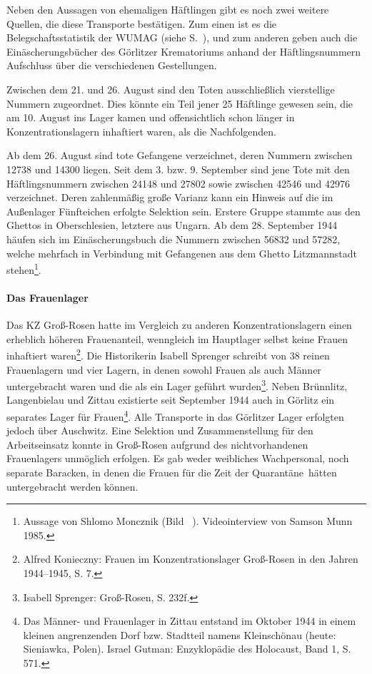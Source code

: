 Neben den Aussagen von ehemaligen Häftlingen gibt es noch zwei weitere Quellen, die diese Transporte bestätigen. Zum einen ist es die Belegschaftsstatistik der WUMAG (siehe S.~\pageref{wumag_pers}), und zum anderen geben auch die Einäscherungsbücher des Görlitzer Krematoriums anhand der Häftlingsnummern Aufschluss über die verschiedenen Gestellungen.\newline


Zwischen dem 21. und 26. August sind den Toten ausschließlich vierstellige Nummern zugeordnet. Dies könnte ein Teil jener 25 Häftlinge gewesen sein, die am 10. August ins Lager kamen und offensichtlich schon länger in Konzentrationslagern inhaftiert waren, als die Nachfolgenden.\newline

Ab dem 26. August sind tote Gefangene verzeichnet, deren Nummern zwischen 12738 und 14300 liegen. Seit dem 3. bzw. 9. September sind jene Tote mit den Häftlingsnummern zwischen 24148 und 27802 sowie zwischen 42546 und 42976 verzeichnet. Deren zahlenmäßig große Varianz kann ein Hinweis auf die im Außenlager Fünfteichen erfolgte Selektion sein. Erstere Gruppe stammte aus den Ghettos in Oberschlesien, letztere aus Ungarn.
Ab dem 28. September 1944 häufen sich im Einäscherungsbuch die Nummern zwischen 56832 und 57282, welche mehrfach in Verbindung mit Gefangenen aus dem Ghetto Litzmannstadt stehen\footnote{Aussage von Shlomo Moncznik (Bild ~). Videointerview von Samson Munn 1985.}.


\paragraph{Das Frauenlager}
Das KZ Groß-Rosen hatte im Vergleich zu anderen Konzentrationslagern einen erheblich höheren Frauenanteil, wenngleich im Hauptlager selbst keine Frauen inhaftiert waren\footnote{Alfred Konieczny: Frauen im Konzentrationslager Groß-Rosen in den Jahren 1944--1945, S. 7.}. Die Historikerin Isabell Sprenger schreibt von 38 reinen Frauenlagern und vier Lagern, in denen sowohl Frauen als auch Männer untergebracht waren und die als ein Lager geführt wurden\footnote{Isabell Sprenger: Groß-Rosen, S. 232f.}. Neben Brünnlitz, Langenbielau und Zittau existierte seit September 1944 auch in Görlitz ein separates Lager für Frauen\footnote{Das Männer- und Frauenlager in Zittau entstand im Oktober 1944 in einem kleinen angrenzenden Dorf bzw. Stadtteil namens Kleinschönau (heute: Sieniawka, Polen). Israel Gutman: Enzyklopädie des Holocaust, Band 1, S. 571.}. Alle Transporte in das Görlitzer Lager erfolgten jedoch über Auschwitz. Eine Selektion und Zusammenstellung für den Arbeitseinsatz konnte in Groß-Rosen aufgrund des nichtvorhandenen Frauenlagers unmöglich erfolgen. Es gab weder weibliches Wachpersonal, noch separate Baracken, in denen die Frauen für die Zeit der \glqq Quarantäne\grqq~hätten untergebracht werden können.\newline

